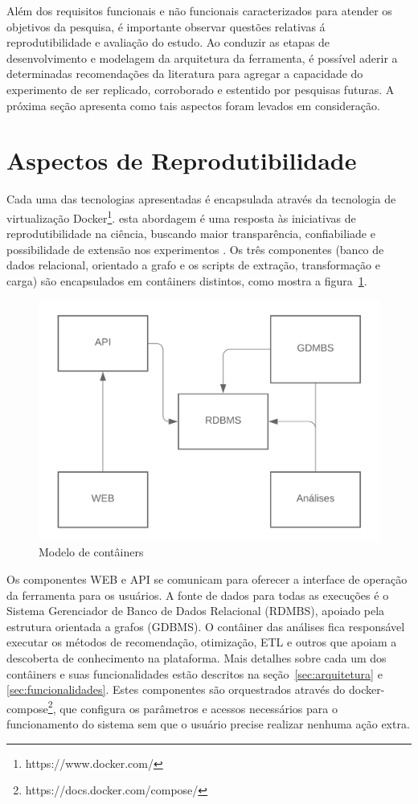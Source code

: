 \documentclass[12pt,openany,oneside,a4paper,english,brazil]{abntbibufjf}
\begin{document}
    Além dos requisitos funcionais e não funcionais caracterizados para atender os objetivos da pesquisa, é importante observar questões relativas á reprodutibilidade e avaliação do estudo. Ao conduzir as etapas de desenvolvimento e modelagem da arquitetura da ferramenta, é possível aderir a determinadas recomendações da literatura para agregar a capacidade do experimento de ser replicado, corroborado e estentido por pesquisas futuras. A próxima seção apresenta como tais aspectos foram levados em consideração.

    \section{Aspectos de Reprodutibilidade}

    Cada uma das tecnologias apresentadas é encapsulada através da tecnologia de virtualização Docker\footnote{https://www.docker.com/}. esta abordagem é uma resposta às iniciativas de reprodutibilidade na ciência, buscando maior transparência, confiabiliade e possibilidade de extensão nos experimentos \cite{freire2012}. Os três componentes (banco de dados relacional, orientado a grafo e os scripts de extração, transformação e carga) são encapsulados em contâiners distintos, como mostra a figura~\ref{fig:docker-model}.

    \begin{figure}[!htbp]
     \includegraphics[width=.7\textwidth]{docker-model}
     \caption{Modelo de contâiners}\label{fig:docker-model}
    \end{figure}

    Os componentes WEB e API se comunicam para oferecer a interface de operação da ferramenta para os usuários. A fonte de dados para todas as execuções é o Sistema Gerenciador de Banco de Dados Relacional (RDMBS), apoiado pela estrutura orientada a grafos (GDBMS). O contâiner das análises fica responsável executar os métodos de recomendação, otimização, ETL e outros que apoiam a descoberta de conhecimento na plataforma. Mais detalhes sobre cada um dos contâiners e suas funcionalidades estão descritos na seção~\ref{sec:arquitetura} e \ref{sec:funcionalidades}. Estes componentes são orquestrados através do docker-compose\footnote{https://docs.docker.com/compose/}, que configura os parâmetros e acessos necessários para o funcionamento do sistema sem que o usuário precise realizar nenhuma ação extra.
\end{document}
